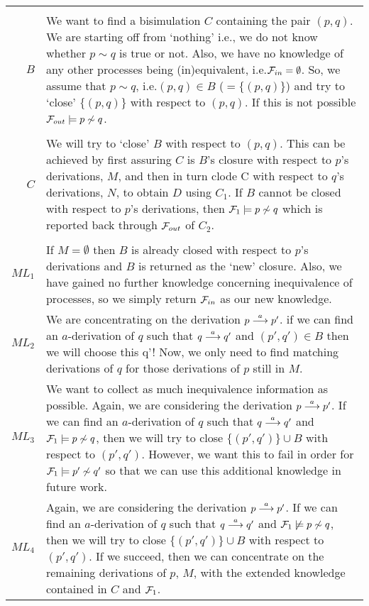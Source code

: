\begin{minipage}{\linewidth}\label{figNewSysInfInformal}
\begingroup\scriptsize%
\begin{tabular}{r@{$\;$:$\;\;$}p{.7\linewidth}}
\multicolumn{2}{l}{}\\
$B$ &
We want to find a bisimulation $C$ containing the pair $(p,q)$. We are starting off from `nothing' i.e.\@, we do not know whether $p\sim q$ is true or not. Also, we have no knowledge of any other processes being (in)equivalent, i.e.\@ ${\cal F}_{in}=\emptyset$. So, we assume that $p\sim q$, i.e.\@ $(p,q)\in B$ ($= \{(p,q)\}$) and try to `close' $\{(p,q)\}$ with respect to $(p,q)$. If this is not possible ${\cal F}_{out}\models p\not\sim q$.\\
\multicolumn{2}{l}{}\\
$C$ &
We will try to `close' $B$ with respect to $(p,q)$. This can be achieved by first assuring $C$ is $B$'s closure with respect to $p$'s derivations, $M$, and then in turn clode C with respect to $q$'s derivations, $N$, to obtain $D$ using $C_1$. If $B$ cannot be closed with respect to $p$'s derivations, then ${\cal F}_1\models p\not\sim q$ which is reported back through ${\cal F}_{out}$ of $C_2$.\\
\multicolumn{2}{l}{}\\
$ML_1$ &
If $M=\emptyset$ then $B$ is already closed with respect to $p$'s derivations and $B$ is returned as the `new' closure. Also, we have gained no further knowledge concerning inequivalence of processes, so we simply return ${\cal F}_{in}$ as our new knowledge.\\

$ML_2$ &
We are concentrating on the derivation $p\stackrel{a}{\longrightarrow} p'$. if we can find an $a$-derivation of $q$ such that $q\stackrel{a}{\longrightarrow}q'$ and $(p',q')\in B$ then we will choose this q'! Now, we only need to find matching derivations of $q$ for those derivations of $p$ still in $M$.\\

$ML_3$ &
We want to collect as much inequivalence information as possible. Again, we are considering the derivation $p\stackrel{a}{\longrightarrow}p'$. If we can find an $a$-derivation of $q$ such that $q\stackrel{a}{\longrightarrow}q'$ and ${\cal F}_1\models p\not\sim q$, then we will try to close $\{(p',q')\}\cup B$ with respect to $(p',q')$. However, we want this to fail in order for ${\cal F}_1\models p'\not\sim q'$ so that we can use this additional knowledge in future work.\\

$ML_4$ &
Again, we are considering the derivation $p\stackrel{a}{\longrightarrow}p'$. If we can find an $a$-derivation of $q$ such that $q\stackrel{a}{\longrightarrow}q'$ and ${\cal F}_1\not\models p\not\sim q$, then we will try to close $\{(p',q')\}\cup B$ with respect to $(p',q')$. If we succeed, then we can concentrate on the remaining derivations of $p$, $M$, with the extended knowledge contained in $C$ and ${\cal F}_1$.\\


\end{tabular}
\end{minipage}
